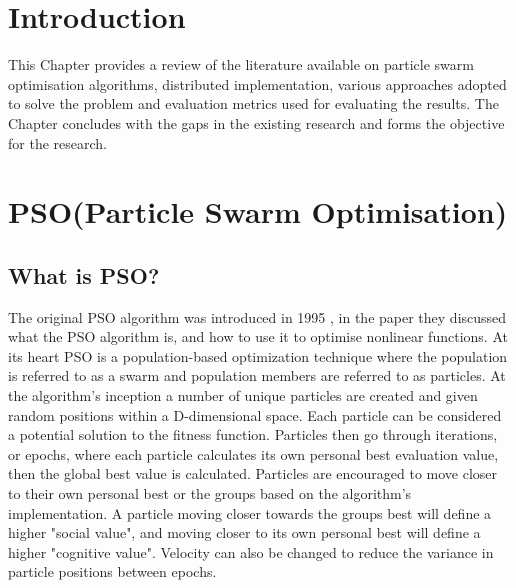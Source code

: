 \documentclass[oneside,12pt]{book}
\begin{document}
\section{Introduction}
This Chapter provides a review of the literature available on particle swarm optimisation algorithms, distributed implementation, various approaches adopted to solve the problem and evaluation metrics used for evaluating the results. The Chapter concludes with the gaps in the existing research and forms the objective for the research.
\section{PSO(Particle Swarm Optimisation)}
\subsection{What is PSO?}
The original PSO algorithm was introduced in 1995 \cite{kennedy1995particle}, in the paper they discussed what the PSO algorithm is, and how to use it to optimise nonlinear functions. At its heart PSO is a population-based optimization technique where the population is referred to as a swarm and population members are referred to as particles. At the algorithm's inception a number of unique particles are created and given random positions within a D-dimensional space. Each particle can be considered a potential solution to the fitness function. Particles then go through iterations, or epochs, where each particle calculates its own personal best evaluation value, then the global best value is calculated. Particles are encouraged to move closer to their own personal best or the groups based on the algorithm's implementation. A particle moving closer towards the groups best will define a higher "social value", and moving closer to its own personal best will define a higher "cognitive value". Velocity can also be changed to reduce the variance in particle positions between epochs.
\end{document}
